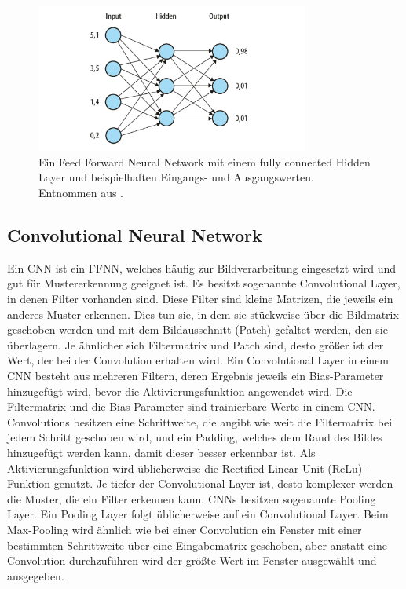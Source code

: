 \begin{figure}[!ht]%
\centering
	\includegraphics[width=0.80\textwidth]{./Bilder/ANN.png}
	\caption[Feed Forward Neural Network]{Ein Feed Forward Neural Network mit einem fully connected Hidden Layer und beispielhaften Eingangs- und Ausgangswerten. Entnommen aus \cite{nguyen_machine_2018}.}
\label{fig:ANN}
\end{figure}

\subsection{Convolutional Neural Network}

Ein \gls{CNN} ist ein \gls{FFNN}, welches häufig zur Bildverarbeitung eingesetzt wird und gut für Mustererkennung geeignet ist. Es besitzt sogenannte Convolutional Layer, in denen Filter vorhanden sind. Diese Filter sind kleine Matrizen, die jeweils ein anderes Muster erkennen. Dies tun sie, in dem sie stückweise über die Bildmatrix geschoben werden und mit dem Bildausschnitt (Patch) gefaltet werden, den sie überlagern. Je ähnlicher sich Filtermatrix und Patch sind, desto größer ist der Wert, der bei der Convolution erhalten wird. Ein Convolutional Layer in einem \gls{CNN} besteht aus mehreren Filtern, deren Ergebnis jeweils ein Bias-Parameter hinzugefügt wird, bevor die Aktivierungsfunktion angewendet wird. Die Filtermatrix und die Bias-Parameter sind trainierbare Werte in einem \gls{CNN}. Convolutions besitzen eine Schrittweite, die angibt wie weit die Filtermatrix bei jedem Schritt geschoben wird, und ein Padding, welches dem Rand des Bildes hinzugefügt werden kann, damit dieser besser erkennbar ist. Als Aktivierungsfunktion wird üblicherweise die Rectified Linear Unit (ReLu)-Funktion genutzt. Je tiefer der Convolutional Layer ist, desto komplexer werden die Muster, die ein Filter erkennen kann. CNNs besitzen sogenannte Pooling Layer. Ein Pooling Layer folgt üblicherweise auf ein Convolutional Layer. Beim Max-Pooling wird ähnlich wie bei einer Convolution ein Fenster mit einer bestimmten Schrittweite über eine Eingabematrix geschoben, aber anstatt eine Convolution durchzuführen wird der größte Wert im Fenster ausgewählt und ausgegeben. \cite{burkov_machine_2019}

